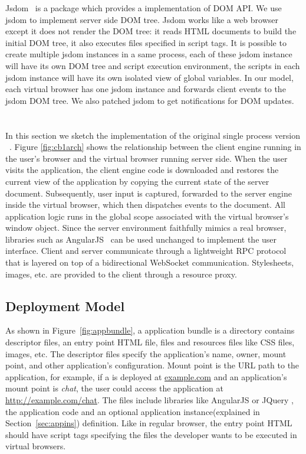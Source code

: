 Jsdom~\cite{JSDOM} is a \nodejs package which provides a \js implementation of 
DOM API. We use jsdom to implement server side DOM tree.
Jsdom works like a web browser except it does not render the DOM tree:
it reads HTML documents to build the initial DOM tree,
it also executes \js files specified in script tags.
It is possible to create multiple jsdom instances in a same process,
each of these jsdom instance will have its own DOM tree and
script execution environment,
the scripts in each jsdom instance will have its own isolated view of global variables.
In our model, each virtual browser has one jsdom instance and
forwards client events to the jsdom DOM tree.
We also patched jsdom to get notifications for DOM updates.


\section{\cb}

\architectureoverview{}

In this section we sketch the implementation of
the original single process version \cb{}~\cite{mcdaniel2012cloudbrowser}.
Figure \ref{fig:cb1arch} shows the relationship
between the client engine running in the user's browser and the virtual browser
running server side.  When the user visits the application, the client engine
code is downloaded and restores the current view of the application by
copying the current state of the server document.  Subsequently, user input
is captured, forwarded to the server engine inside the virtual browser,
which then dispatches events to the document.  All application logic runs
in the global scope associated with the virtual browser's window object.
Since the server environment faithfully mimics a real browser, libraries
such as AngularJS~\cite{hevery2009angular} can be used unchanged to implement the user interface.
Client and server communicate through a lightweight RPC protocol that is
layered on top of a bidirectional WebSocket communication.
Stylesheets, images, etc. are provided to the client through a resource
proxy.

\subsection{Deployment Model}
\label{sec:deploymodel}
\appbundlefig{}
As shown in Figure~\ref{fig:appbundle}, 
a \cb application bundle is a directory
contains descriptor files, an entry point HTML file,
\js files and resources files like CSS files, images, etc.
The descriptor files specify the application's name, owner, mount point, and
other application's configuration.
Mount point is the URL path to the application, for example,
if a \cb is deployed at \url{example.com} and an application's mount point is
\emph{chat}, the user could access the application at \url{http://example.com/chat}.
The \js files include libraries like AngularJS or JQuery
, the application code and an optional application instance(explained 
in Section~\ref{sec:appins}) definition.
Like in regular browser, the entry point HTML should have script tags
specifying the \js files the developer wants to be executed in virtual browsers.

